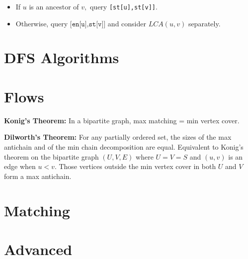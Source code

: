 		\begin{itemize}
		\item If $u$ is an ancestor of $v,$ query \texttt{[st[u],st[v]]}.
		\item Otherwise, query $\texttt{[en[u],st[v]]}$ and consider $LCA(u,v)$ separately.
		\end{itemize}

\section{DFS Algorithms}

\section{Flows}

	\textbf{Konig's Theorem:} In a bipartite graph, max matching = min vertex cover.

	\textbf{Dilworth's Theorem:} For any partially ordered set, the sizes of the max antichain and of the min chain decomposition are equal. Equivalent to Konig's theorem on the bipartite graph $(U,V,E)$ where $U=V=S$ and $(u,v)$ is an edge when $u<v$. Those vertices outside the min vertex cover in both $U$ and $V$ form a max antichain.



\section{Matching}


\section{Advanced}

